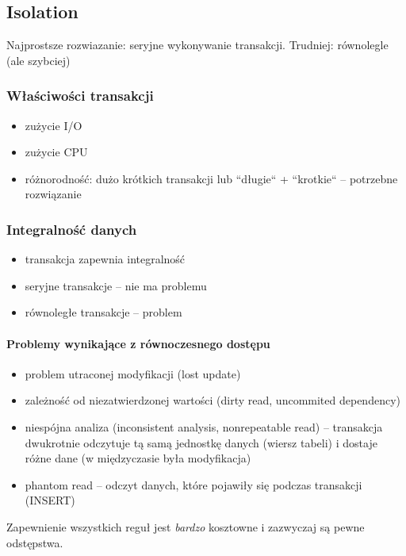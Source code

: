 \documentclass[12pt]{article}
\begin{document}
\subsection{Isolation}
Najprostsze rozwiazanie: seryjne wykonywanie transakcji.
Trudniej: równolegle (ale szybciej)

\subsubsection{Właściwości transakcji}
\begin{itemize}
  \item zużycie I/O
  \item zużycie CPU
  \item różnorodność: dużo krótkich transakcji lub ``długie`` + ``krotkie`` -- potrzebne rozwiązanie
\end{itemize}

\subsubsection{Integralność danych}
\begin{itemize}
  \item transakcja zapewnia integralność
  \item seryjne transakcje -- nie ma problemu
  \item równoległe transakcje -- problem
\end{itemize}

\paragraph{Problemy wynikające z równoczesnego dostępu}
\begin{itemize}
  \item problem utraconej modyfikacji (lost update)
  \item zależność od niezatwierdzonej wartości (dirty read, uncommited dependency)
  \item niespójna analiza (inconsistent analysis, nonrepeatable read) -- transakcja dwukrotnie odczytuje
      tą samą jednostkę danych (wiersz tabeli) i dostaje różne dane (w międzyczasie była modyfikacja)
  \item phantom read -- odczyt danych, które pojawiły się podczas transakcji (INSERT)
\end{itemize}

Zapewnienie wszystkich reguł jest \emph{bardzo} kosztowne i zazwyczaj są pewne odstępstwa.
\end{document}
